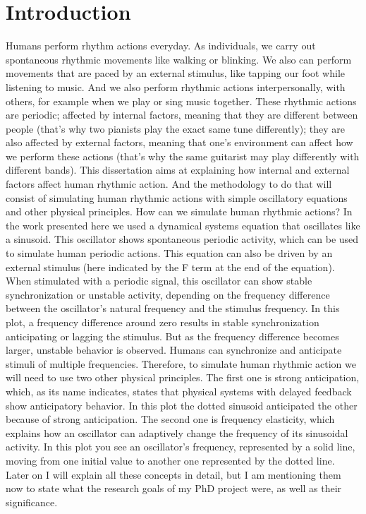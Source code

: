 \documentclass{report}
\begin{document}
\chapter{Introduction}
Humans perform rhythm actions everyday. As individuals, we carry out spontaneous rhythmic movements like walking or blinking. We also can perform movements that are paced by an external stimulus, like tapping our foot while listening to music. And we also perform rhythmic actions interpersonally, with others, for example when we play or sing music together.
These rhythmic actions are periodic; affected by internal factors, meaning that they are different between people (that’s why two pianists play the exact same tune differently); they are also affected by external factors, meaning that one’s environment can affect how we perform these actions (that’s why the same guitarist may play differently with different bands). This dissertation aims at explaining how internal and external factors affect human rhythmic action. And the methodology to do that will consist of simulating human rhythmic actions with simple oscillatory equations and other physical principles. 
How can we simulate human rhythmic actions? In the work presented here we used a dynamical systems equation that oscillates like a sinusoid. This oscillator shows spontaneous periodic activity, which can be used to simulate human periodic actions. This equation can also be driven by an external stimulus (here indicated by the F term at the end of the equation). When stimulated with a periodic signal, this oscillator can show stable synchronization or unstable activity, depending on the frequency difference between the oscillator’s natural frequency and the stimulus frequency. In this plot, a frequency difference around zero results in stable synchronization anticipating or lagging the stimulus. But as the frequency difference becomes larger, unstable behavior is observed. Humans can synchronize and anticipate stimuli of multiple frequencies. Therefore, to simulate human rhythmic action we will need to use two other physical principles. The first one is strong anticipation, which, as its name indicates, states that physical systems with delayed feedback show anticipatory behavior. In this plot the dotted sinusoid anticipated the other because of strong anticipation. The second one is frequency elasticity, which explains how an oscillator can adaptively change the frequency of its sinusoidal activity. In this plot you see an oscillator’s frequency, represented by a solid line, moving from one initial value to another one represented by the dotted line. Later on I will explain all these concepts in detail, but I am mentioning them now to state what the research goals of my PhD project were, as well as their significance. 
\end{document}
